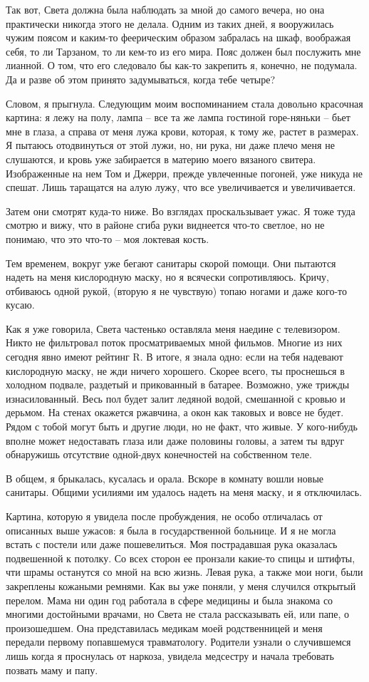 \documentclass[
]{book}
\begin{document}
Так вот, Света должна была наблюдать за мной до самого вечера, но она практически никогда этого не делала. Одним из таких дней, я вооружилась чужим поясом и каким-то феерическим образом забралась на шкаф, воображая себя, то ли Тарзаном, то ли кем-то из его мира. Пояс должен был послужить мне лианной. О том, что его следовало бы как-то закрепить я, конечно, не подумала. Да и разве об этом принято задумываться, когда тебе четыре?

Словом, я прыгнула. Следующим моим воспоминанием стала довольно красочная картина: я лежу на полу, лампа -- все та же лампа гостиной горе-няньки -- бьет мне в глаза, а справа от меня лужа крови, которая, к тому же, растет в размерах. Я пытаюсь отодвинуться от этой лужи, но, ни рука, ни даже плечо меня не слушаются, и кровь уже забирается в материю моего вязаного свитера. Изображенные на нем Том и Джерри, прежде увлеченные погоней, уже никуда не спешат. Лишь таращатся на алую лужу, что все увеличивается и увеличивается.

Затем они смотрят куда-то ниже. Во взглядах проскальзывает ужас. Я тоже туда смотрю и вижу, что в районе сгиба руки виднеется что-то светлое, но не понимаю, что это что-то -- моя локтевая кость.

Тем временем, вокруг уже бегают санитары скорой помощи. Они пытаются надеть на меня кислородную маску, но я всячески сопротивляюсь. Кричу, отбиваюсь одной рукой, (вторую я не чувствую) топаю ногами и даже кого-то кусаю.

Как я уже говорила, Света частенько оставляла меня наедине с телевизором. Никто не фильтровал поток просматриваемых мной фильмов. Многие из них сегодня явно имеют рейтинг R. В итоге, я знала одно: если на тебя надевают кислородную маску, не жди ничего хорошего. Скорее всего, ты проснешься в холодном подвале, раздетый и прикованный в батарее. Возможно, уже трижды изнасилованный. Весь пол будет залит ледяной водой, смешанной с кровью и дерьмом. На стенах окажется ржавчина, а окон как таковых и вовсе не будет. Рядом с тобой могут быть и другие люди, но не факт, что живые. У кого-нибудь вполне может недоставать глаза или даже половины головы, а затем ты вдруг обнаружишь отсутствие одной-двух конечностей на собственном теле.

В общем, я брыкалась, кусалась и орала. Вскоре в комнату вошли новые санитары. Общими усилиями им удалось надеть на меня маску, и я отключилась.

Картина, которую я увидела после пробуждения, не особо отличалась от описанных выше ужасов: я была в государственной больнице. И я не могла встать с постели или даже пошевелиться. Моя пострадавшая рука оказалась подвешенной к потолку. Со всех сторон ее пронзали какие-то спицы и штифты, чти шрамы останутся со мной на всю жизнь. Левая рука, а также мои ноги, были закреплены кожаными ремнями. Как вы уже поняли, у меня случился открытый перелом. Мама ни один год работала в сфере медицины и была знакома со многими достойными врачами, но Света не стала рассказывать ей, или папе, о произошедшем. Она представилась медикам моей родственницей и меня передали первому попавшемуся травматологу. Родители узнали о случившемся лишь когда я проснулась от наркоза, увидела медсестру и начала требовать позвать маму и папу.
\end{document}

